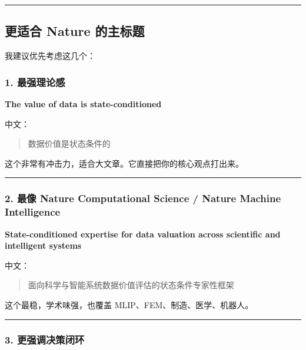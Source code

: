 \documentclass[
  12pt,
]{ctexart}
\begin{document}
\begin{center}\rule{0.5\linewidth}{0.5pt}\end{center}

\subsection{更适合 Nature
的主标题}\label{ux66f4ux9002ux5408-nature-ux7684ux4e3bux6807ux9898}

我建议优先考虑这几个：

\subsubsection{1. 最强理论感}\label{ux6700ux5f3aux7406ux8bbaux611f}

\textbf{The value of data is state-conditioned}

中文：

\begin{quote}
数据价值是状态条件的
\end{quote}

这个非常有冲击力，适合大文章。它直接把你的核心观点打出来。

\begin{center}\rule{0.5\linewidth}{0.5pt}\end{center}

\subsubsection{2. 最像 Nature Computational Science / Nature Machine
Intelligence}\label{ux6700ux50cf-nature-computational-science-nature-machine-intelligence}

\textbf{State-conditioned expertise for data valuation across scientific
and intelligent systems}

中文：

\begin{quote}
面向科学与智能系统数据价值评估的状态条件专家性框架
\end{quote}

这个最稳，学术味强，也覆盖 MLIP、FEM、制造、医学、机器人。

\begin{center}\rule{0.5\linewidth}{0.5pt}\end{center}

\subsubsection{3.
更强调决策闭环}\label{ux66f4ux5f3aux8c03ux51b3ux7b56ux95edux73af}
\end{document}
